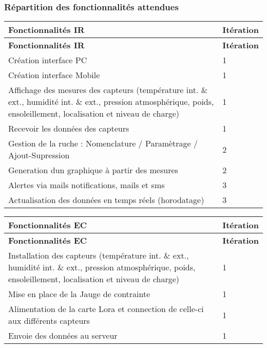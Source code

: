 \subsubsection*{Répartition des fonctionnalités attendues}

\tabulinesep=1mm
\begin{longtabu} spread 0pt [c]{*{2}{|X[-1]}|}
\hline
\rowcolor{\tableheadbgcolor}\textbf{ Fonctionnalités IR }&\textbf{ Itération  }\\
\endfirsthead
\hline
\endfoot
\hline
\rowcolor{\tableheadbgcolor}\textbf{ Fonctionnalités IR }&\textbf{ Itération  }\\
\endhead
Création interface PC &1 \\
Création interface Mobile &1 \\
Affichage des mesures des capteurs (température int. \& ext., humidité int. \& ext., pression atmosphérique, poids, ensoleillement, localisation et niveau de charge) &1 \\
Recevoir les données des capteurs &1 \\
Gestion de la ruche \+: Nomenclature / Paramètrage / Ajout-\/\+Supression &2 \\
Generation d\textquotesingle{}un graphique à partir des mesures &2 \\
Alertes via mails notifications, mails et sms &3 \\
Actualisation des données en temps réels (horodatage) &3 \\
\end{longtabu}
\tabulinesep=1mm
\begin{longtabu} spread 0pt [c]{*{2}{|X[-1]}|}
\hline
\rowcolor{\tableheadbgcolor}\textbf{ Fonctionnalités EC }&\textbf{ Itération  }\\
\endfirsthead
\hline
\endfoot
\hline
\rowcolor{\tableheadbgcolor}\textbf{ Fonctionnalités EC }&\textbf{ Itération  }\\
\endhead
Installation des capteurs (température int. \& ext., humidité int. \& ext., pression atmosphérique, poids, ensoleillement, localisation et niveau de charge) &1 \\
Mise en place de la Jauge de contrainte &1 \\
Alimentation de la carte Lora et connection de celle-\/ci aux différents capteurs &1 \\
Envoie des données au serveur &1 \\
\end{longtabu}

